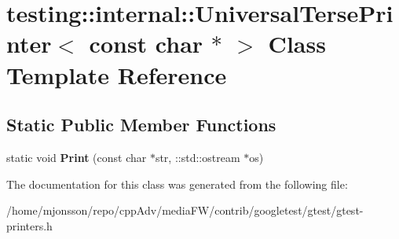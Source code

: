 \hypertarget{classtesting_1_1internal_1_1UniversalTersePrinter_3_01const_01char_01_5_01_4}{}\section{testing\+:\+:internal\+:\+:Universal\+Terse\+Printer$<$ const char $\ast$ $>$ Class Template Reference}
\label{classtesting_1_1internal_1_1UniversalTersePrinter_3_01const_01char_01_5_01_4}
\subsection*{Static Public Member Functions}
\begin{DoxyCompactItemize}
\item 
\mbox{\label{classtesting_1_1internal_1_1UniversalTersePrinter_3_01const_01char_01_5_01_4_a37a3be2d26dc07b24d16c2b5eb88ecda}} 
static void {\bfseries Print} (const char $\ast$str, \+::std\+::ostream $\ast$os)
\end{DoxyCompactItemize}


The documentation for this class was generated from the following file\+:\begin{DoxyCompactItemize}
\item 
/home/mjonsson/repo/cpp\+Adv/media\+F\+W/contrib/googletest/gtest/gtest-\/printers.\+h\end{DoxyCompactItemize}
